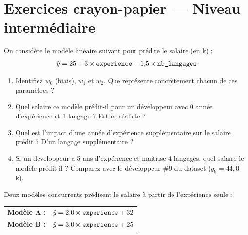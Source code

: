 \section*{Exercices crayon-papier --- Niveau interm\'{e}diaire}


On consid\`{e}re le mod\`{e}le lin\'{e}aire suivant pour pr\'{e}dire le salaire (en k\texteuro) :
\[
    \hat{y} = 25 + 3 \times \texttt{experience} + 1{,}5 \times \texttt{nb\_langages}
\]

\begin{enumerate}[label=\alph*)]
    \item Identifiez $w_0$ (biais), $w_1$ et $w_2$.
        Que repr\'{e}sente concr\`{e}tement chacun de ces param\`{e}tres ?

    \item Quel salaire ce mod\`{e}le pr\'{e}dit-il pour un d\'{e}veloppeur avec 0 ann\'{e}e
        d'exp\'{e}rience et 1 langage ? Est-ce r\'{e}aliste ?

    \item Quel est l'impact d'une ann\'{e}e d'exp\'{e}rience suppl\'{e}mentaire sur le salaire
        pr\'{e}dit ? D'un langage suppl\'{e}mentaire ?

    \item Si un d\'{e}veloppeur a 5 ans d'exp\'{e}rience et ma\^{i}trise 4 langages,
        quel salaire le mod\`{e}le pr\'{e}dit-il ?
        Comparez avec le d\'{e}veloppeur \#9 du dataset ($y_9 = 44{,}0$ k\texteuro).
\end{enumerate}


Deux mod\`{e}les concurrents pr\'{e}disent le salaire \`{a} partir de l'exp\'{e}rience seule :

\begin{center}
\renewcommand{\arraystretch}{1.1}
\begin{tabular}{l l}
    \toprule
    \textbf{Mod\`{e}le A :} & $\hat{y} = 2{,}0 \times \texttt{experience} + 32$ \\
    \textbf{Mod\`{e}le B :} & $\hat{y} = 3{,}0 \times \texttt{experience} + 25$ \\
    \bottomrule
\end{tabular}
\end{center}


